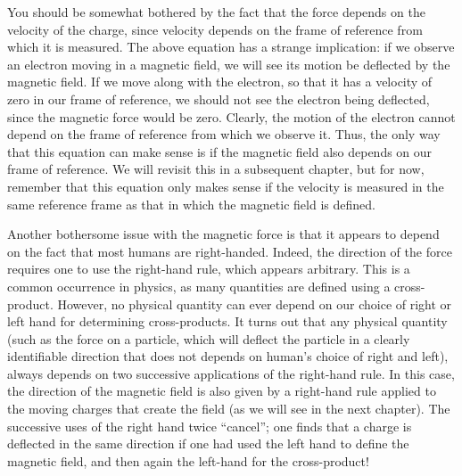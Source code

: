 You should be somewhat bothered by the fact that the force depends on the velocity of the charge, since velocity depends on the frame of reference from which it is measured. The above equation has a strange implication: if we observe an electron moving in a magnetic field, we will see its motion be deflected by the magnetic field. If we move along with the electron, so that it has a velocity of zero in our frame of reference, we should not see the electron being deflected, since the magnetic force would be zero. Clearly, the motion of the electron cannot depend on the frame of reference from which we observe it. Thus, the only way that this equation can make sense is if the magnetic field also depends on our frame of reference. We will revisit this in a subsequent chapter, but for now, remember that this equation only makes sense if the velocity is measured in the same reference frame as that in which the magnetic field is defined.

Another bothersome issue with the magnetic force is that it appears to depend on the fact that most humans are right-handed. Indeed, the direction of the force requires one to use the right-hand rule, which appears arbitrary. This is a common occurrence in physics, as many quantities are defined using a cross-product. However, no physical quantity can ever depend on our choice of right or left hand for determining cross-products. It turns out that any physical quantity (such as the force on a particle, which will deflect the particle in a clearly identifiable direction that does not depends on human's choice of right and left), always depends on two successive applications of the right-hand rule. In this case, the direction of the magnetic field is also given by a right-hand rule applied to the moving charges that create the field (as we will see in the next chapter). The successive uses of the right hand twice ``cancel''; one finds that a charge is deflected in the same direction if one had used the left hand to define the magnetic field, and then again the left-hand for the cross-product!

